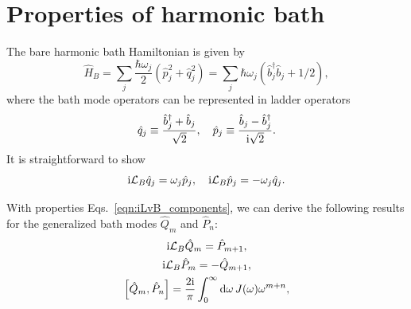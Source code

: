 \documentclass[preprint,aip,jcp]{revtex4-2}
\newcommand{\im}{\textup{i}}
\newcommand{\Lv}{\mathcal{L}}
\begin{document}
\section{Properties of harmonic bath\label{app:bath}}
The bare harmonic bath Hamiltonian is given by
\begin{equation}
    \hat{H}_B = \sum_j \frac{\hbar\omega_j}{2}(\hat{p}_j^2 +  \hat{q}_j^2) = \sum_j \hbar \omega_j (\hat{b}_j^\dagger \hat{b}_j + 1/2),
\end{equation}
where the bath mode operators can be represented in ladder operators 
\begin{equation}\label{eqn:ladder_qp}
    \hat{q}_j \equiv \frac{\hat{b}_{j}^{\dagger} + \hat{b}_j}{\sqrt{2}}, \quad \hat{p}_j \equiv \frac{\hat{b}_j - \hat{b}_{j}^{\dagger} }{\im \sqrt{2}}.
\end{equation}
It is straightforward to show 
\begin{equation}\label{eqn:iLvB_components}
    \im \Lv_B \hat{q}_j = \omega_j \hat{p}_j, \quad \im \Lv_B \hat{p}_j = -\omega_j \hat{q}_j. %
\end{equation} 

With properties Eqs.~\ref{eqn:iLvB_components}, we can derive the following results for the generalized bath modes $\hat{Q}_m$ and $\hat{P}_n$:
\begin{gather}
    \im \Lv_B \hat{Q}_m = \hat{P}_{m+1}, \label{eqn:iLvBQ}\\
    \im \Lv_B \hat{P}_m = - \hat{Q}_{m+1}, \label{eqn:iLvBP}\\
    \comm{\hat{Q}_m}{\hat{P}_n} = \frac{2\im}{\pi} \int_{0}^{\infty} \dd{\omega} J(\omega) \omega^{m+n},  \label{eqn:comm_Q_P}%
\end{gather}
\end{document}
